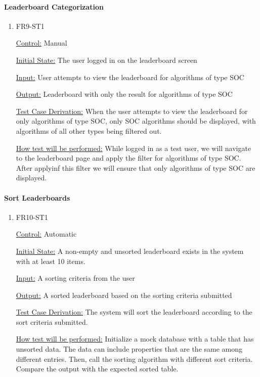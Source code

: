 \documentclass[12pt, titlepage]{article}
\begin{document}
\paragraph{Leaderboard Categorization}

\begin{enumerate}

\item{FR9-ST1\\}

\underline{Control:} Manual

\underline{Initial State:} The user logged in on the leaderboard screen

\underline{Input:} User attempts to view the leaderboard for algorithms of type SOC

\underline{Output:} Leaderboard with only the result for algorithms of type SOC

\underline{Test Case Derivation:} When the user attempts to view the leaderboard for only algorithms of type SOC, only SOC algorithms should be displayed, with algorithms of all other types being filtered out.

\underline{How test will be performed:} While logged in as a test user, we will navigate to the leaderboard page and apply the filter for algorithms of type SOC. After applyinf this filter we will ensure that only algorithms of type SOC are displayed.

\end{enumerate}

\paragraph{Sort Leaderboards}

\begin{enumerate}

\item{FR10-ST1\\}

\underline{Control:} Automatic

\underline{Initial State:} A non-empty and unsorted leaderboard exists in the system with at least 10 items.

\underline{Input:} A sorting criteria from the user

\underline{Output:} A sorted leaderboard based on the sorting criteria submitted

\underline{Test Case Derivation:} The system will sort the leaderboard according to the sort criteria submitted.

\underline{How test will be performed:} Initialize a mock database with a table that has unsorted data. The data can include properties that are the same among different entries. Then, call the sorting algorithm with different sort criteria. Compare the output with the expected sorted table.

\end{enumerate}
\end{document}
